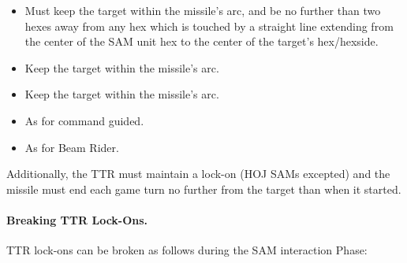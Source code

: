 \begin{itemize}
    \item{} Must keep the target within the missile's  arc, and be no further than two hexes away from any hex which is touched by a straight line extending from the center of the SAM unit hex to the center of the target's hex/hexside.

    \item{} Keep the target within the missile's  arc.

    \item{} Keep the target within the missile's  arc.

    \item{} As for command guided.

    \item{} As for Beam Rider.
\end{itemize}

Additionally, the TTR must maintain a lock-on (HOJ SAMs excepted) and the missile must end each game turn no further from the target than when it started.

\paragraph{Breaking TTR Lock-Ons.} 

TTR lock-ons can be broken as follows during the SAM interaction Phase:

